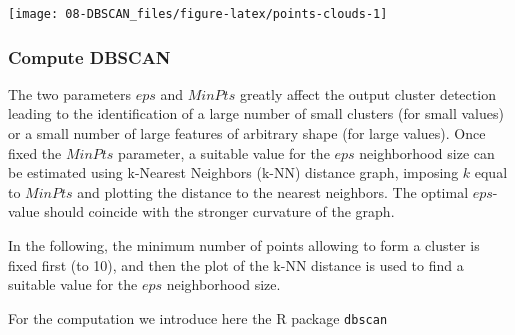 \documentclass[
]{article}
\newenvironment{Shaded}{\begin{snugshade}}{\end{snugshade}}
\newcommand{\AttributeTok}[1]{\textcolor[rgb]{0.13,0.29,0.53}{#1}}
\newcommand{\CommentTok}[1]{\textcolor[rgb]{0.56,0.35,0.01}{\textit{#1}}}
\newcommand{\DecValTok}[1]{\textcolor[rgb]{0.00,0.00,0.81}{#1}}
\newcommand{\FloatTok}[1]{\textcolor[rgb]{0.00,0.00,0.81}{#1}}
\newcommand{\FunctionTok}[1]{\textcolor[rgb]{0.13,0.29,0.53}{\textbf{#1}}}
\newcommand{\NormalTok}[1]{#1}
\newcommand{\OtherTok}[1]{\textcolor[rgb]{0.56,0.35,0.01}{#1}}
\newcommand{\SpecialCharTok}[1]{\textcolor[rgb]{0.81,0.36,0.00}{\textbf{#1}}}
\newcommand{\StringTok}[1]{\textcolor[rgb]{0.31,0.60,0.02}{#1}}
\begin{document}
\begin{Shaded}
\end{Shaded}

\begin{center}\texttt{[image: 08-DBSCAN\_files/figure-latex/points-clouds-1]} \end{center}

\subsubsection{Compute DBSCAN}\label{compute-dbscan}

The two parameters \(eps\) and \(MinPts\) greatly affect the output cluster detection leading to the identification of a large number of small clusters (for small values) or a small number of large features of arbitrary shape (for large values).
Once fixed the \(MinPts\) parameter, a suitable value for the \(eps\) neighborhood size can be estimated using k-Nearest Neighbors (k-NN) distance graph, imposing \(k\) equal to \(MinPts\) and plotting the distance to the nearest neighbors.
The optimal \(eps\)-value should coincide with the stronger curvature of the graph.

In the following, the minimum number of points allowing to form a cluster is fixed first (to 10), and then the plot of the k-NN distance is used to find a suitable value for the \(eps\) neighborhood size.

For the computation we introduce here the R package \texttt{dbscan} \citep{DBSCAN_library}
\end{document}
